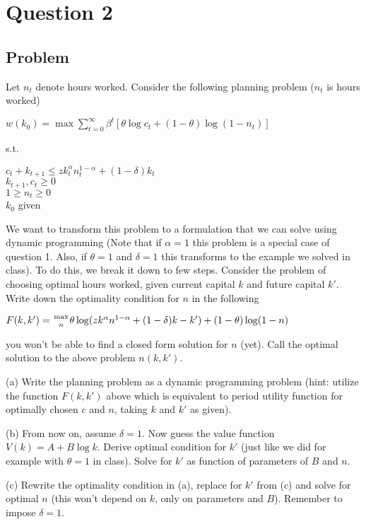 \documentclass[10pt, a4paper]{article}
\begin{document}
\section{Question 2}
  \subsection{Problem}
    Let $n_t$ denote hours worked. Consider the following planning problem ($n_t$ is hours worked)
    \begin{center}
      $w(k_0) = \max\sum_{t=0}^{\infty}\beta^t[\theta\log c_t+(1-\theta)\log(1-n_t)]$
    \end{center}
    s.t.
    \begin{center}
      $c_t+k_{t+1}\leq zk_t^{\alpha}n_t^{1-\alpha}+(1-\delta)k_t$ \\
      $k_{t+1},c_t\geq 0$ \\
      $1\geq n_t\geq 0$ \\
      $k_0$ given
    \end{center}

    We want to transform this problem to a formulation that we can solve using dynamic programming (Note that if $\alpha=1$ this problem is a special case of question 1. Also, if $\theta=1$ and $\delta=1$ this transforms to the example we solved in class). To do this, we break it down to few steps. Consider the problem of choosing optimal hours worked, given current capital $k$ and future capital $k'$. Write down the optimality condition for $n$ in the following
    \begin{center}
      $F(k,k')={\max\atop{n}}\theta\log(zk^{\alpha}n^{1-\alpha}+(1-\delta)k-k')+(1-\theta)\log(1-n)$
    \end{center}
    you won't be able to find a closed form solution for $n$ (yet). Call the optimal solution to the above problem $n(k,k')$.

    (a) Write the planning problem as a dynamic programming problem (hint: utilize the function $F(k,k')$ above which is equivalent to period utility function for optimally chosen $c$ and $n$, taking $k$ and $k'$ as given).

    (b) From now on, assume $\delta=1$. Now guess the value function $V(k)=A+B\log k$. Derive optimal condition for $k'$ (just like we did for example with $\theta=1$ in class). Solve for $k'$ as function of parameters of $B$ and $n$.

    (c) Rewrite the optimality condition in (a), replace for $k'$ from (c) and solve for optimal $n$ (this won't depend on $k$, only on parameters and $B$). Remember to impose $\delta=1$.
\end{document}
